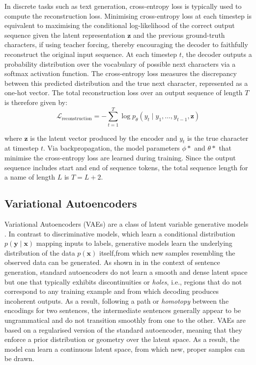 \documentclass[Main.tex]{subfiles}
\begin{document}
In discrete tasks such as text generation, cross-entropy loss is typically used to compute the reconstruction loss. Minimising cross-entropy loss at each timestep is equivalent to maximising the conditional log-likelihood of the correct output sequence given the latent representation $\mathbf{z}$ and the previous ground-truth characters, if using teacher forcing, thereby encouraging the decoder to faithfully reconstruct the original input sequence. At each timestep $t$, the decoder outputs a probability distribution over the vocabulary of possible next characters via a softmax activation function. The cross-entropy loss measures the discrepancy between this predicted distribution and the true next character, represented as a one-hot vector. The total reconstruction loss over an output sequence of length $T$ is therefore given by:
\begin{equation}
\mathcal{L}_{\text{reconstruction}} = -\sum_{t=1}^{T} \log p_\theta(y_t \mid y_{1}, \ldots, y_{t-1}, \mathbf{z})
\end{equation}

where $\mathbf{z}$ is the latent vector produced by the encoder and $y_t$ is the true character at timestep $t$. Via backpropagation, the model parameters $\phi*$ and $\theta*$ that minimise the cross-entropy loss are learned during training. Since the output sequence includes start and end of sequence tokens, the total sequence length for a name of length $L$ is $T=L+2$.

\subsection{Variational Autoencoders}
Variational Autoencoders (VAEs) are a class of latent variable generative models \cite{kingma_auto-encoding_2022}. In contrast to discriminative models, which learn a conditional distribution $p(\mathbf{y} \mid \mathbf{x})$ mapping inputs to labels, generative models learn the underlying distribution of the data $p(\mathbf{x})$ itself,from which new samples resembling the observed data can be generated. As shown in \cite{bowman_generating_2016} in the context of sentence generation, standard autoencoders do not learn a smooth and dense latent space but one that typically exhibits discontinuities or \textit{holes}, i.e., regions that do not correspond to any training example and from which decoding produces incoherent outputs. As a result, following a path or \textit{homotopy} between the encodings for two sentences, the intermediate sentences generally appear to be ungrammatical and do not transition smoothly from one to the other. VAEs are based on a regularised version of the standard autoencoder, meaning that they enforce a prior distribution or geometry over the latent space. As a result, the model can learn a continuous latent space, from which new, proper samples can be drawn.\\
\end{document}
